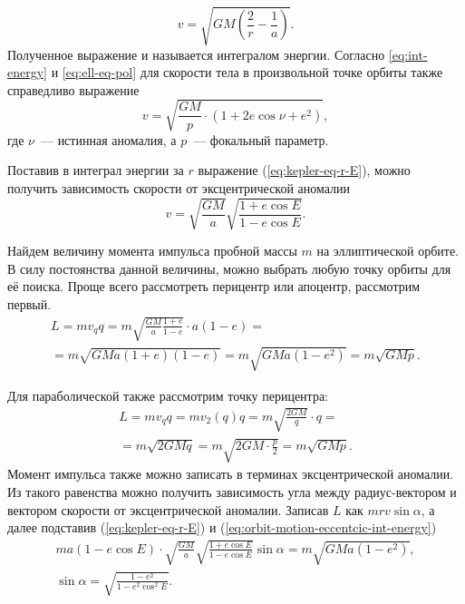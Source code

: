 \begin{equation}
    v = \sqrt{ GM \left( \frac{2}{r} - \frac{1}{a} \right)}.
    \label{eq:int-energy}
\end{equation}
Полученное выражение и называется интегралом энергии. Согласно \eqref{eq:int-energy} и \eqref{eq:ell-eq-pol} для скорости тела в произвольной точке орбиты также справедливо выражение
\begin{equation}
    v = \sqrt{\frac{GM}{p}\cdot(1 + 2 e \cos \nu + e^2)},
\end{equation}
где $\nu$~--- истинная аномалия, а $p$~--- фокальный параметр.

Поставив в интеграл энергии за $r$ выражение (\ref{eq:kepler-eq-r-E}), можно получить зависимость скорости от эксцентрической аномалии
\begin{equation}
	v = \sqrt{\frac{GM}{a}}\sqrt{\frac{1 + e \cos E}{1 - e \cos E}}.
	\label{eq:orbit-motion-eccentcic-int-energy}
\end{equation}

Найдем величину момента импульса пробной массы $m$ на эллиптической орбите. В силу постоянства данной величины, можно выбрать любую точку орбиты для её поиска. Проще всего рассмотреть перицентр или апоцентр, рассмотрим первый.
\begin{multline*}
    L
    = m v_q q
    = m \sqrt{\frac{GM}{a} \frac{1+e}{1-e}} \cdot a(1-e) =\\
    = m \sqrt{GMa (1 + e)(1-e)}
    = m \sqrt{GMa(1-e^2)}
    = m \sqrt{GMp}.
\end{multline*}

Для параболической также рассмотрим точку перицентра:
\begin{multline*}
    L
    = m v_q q
    = m v_2(q) q
    = m \sqrt{\frac{2GM}{q}} \cdot q =\\
    = m \sqrt{2GMq}
    = m \sqrt{2GM \cdot \frac{p}{2}}
    = m \sqrt{GMp}.
\end{multline*}
Момент импульса также можно записать в терминах эксцентрической аномалии. Из такого равенства можно получить зависимость угла между радиус-вектором и вектором скорости от эксцентрической аномалии. Записав $L$ как $m r v \sin \alpha$, а далее подставив (\ref{eq:kepler-eq-r-E}) и (\ref{eq:orbit-motion-eccentcic-int-energy})
\begin{gather}
	m a (1 - e \cos E) \cdot \sqrt{\frac{GM}{a}}\sqrt{\frac{1 + e \cos E}{1 - e \cos E}} \sin \alpha = m \sqrt{GMa(1-e^2)}, \nonumber\\
	 \sin \alpha = \sqrt{\frac{1-e^2}{1- e^2 \cos^2 E}}.
\end{gather}

